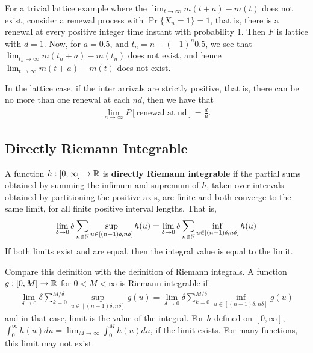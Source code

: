 \documentclass[a4paper,10pt,english]{article}
\begin{document}
\begin{exmp}
\label{eg:lattice limit}
For a trivial lattice example where the $\lim_{t\to \infty} m(t+a)-m(t)$ does not exist, consider a renewal process with $\Pr\{X_n = 1\} = 1$, that is, there is a renewal at every positive integer time instant with probability 1. Then $F$ is lattice with $d=1.$ Now, for $a=0.5$, and $t_n = n+(-1)^n 0.5$, we see that $\lim_{t_n \to \infty} m(t_n+a)-m(t_n)$ does not exist, and hence $\lim_{t \to \infty} m(t+a)-m(t)$ does not exist.
\end{exmp}

\begin{rem}
In the lattice case, if the inter arrivals are strictly positive, that is, there can be no more than one renewal at each $nd$, then we have that 
\begin{align}
\lim_{n\to \infty} P[{\text{renewal at nd}}] = \frac{d}{\mu}.
\end{align}
\end{rem}


\subsection{Directly Riemann Integrable}
\begin{defn}%
A function $h: [0,\infty] \rightarrow \mathbb{R}$ is \textbf{directly Riemann integrable} if the partial sums obtained by summing the infimum and supremum of $h$, taken over intervals obtained by partitioning the positive axis, are finite and both converge to the same limit, for all finite positive interval lengths. That is,
\begin{equation*}
	\lim_{\delta \rightarrow 0} \delta \sum_{n \in \mathbb{N}}\sup_{ u \in [(n-1)\delta,n\delta]}h(u)=\lim_{\delta \rightarrow 0} \delta \sum_{n \in \mathbb{N}}\inf_{ u \in [(n-1)\delta,n\delta]}h(u)  
\end{equation*}   
 If both limits exist and are equal, then the integral value is equal to the limit. 
\end{defn}
	Compare this definition with the definition of Riemann integrals. A function $g: [0, M] \rightarrow \mathbb{R} $ for $0<M<\infty$ is Riemann integrable if 
   \begin{eqnarray*}
  \lim_{\delta \rightarrow 0} \delta \sum_{k=0}^{M/\delta}\sup_{ u \in [(n-1)\delta,n\delta]}g(u)=\lim_{\delta \rightarrow 0} \delta \sum_{k=0}^{M/\delta}\inf_{ u \in [(n-1)\delta,n\delta]}g(u)  
  \end{eqnarray*} 
   and in that case, limit is the value of the integral. For $h$ defined on $[0,\infty]$, $\int_{0}^{\infty}h(u)du = \lim_{M \rightarrow \infty}\int_{0}^{M}h(u)du$, if the limit exists. For many functions, this limit may not exist.
\end{document}
